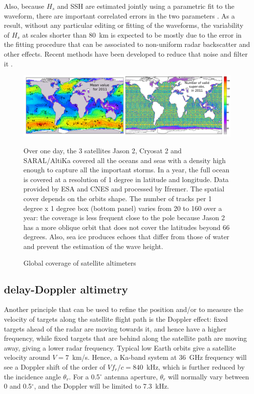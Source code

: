  Also, because $H_s$ and SSH are estimated jointly using a parametric fit to the waveform, there are important correlated errors in the two parameters \citep[e.g.][]{Dibarboure&al.2014,DeCarlo&al.2023}. 
 As a result, without any particular editing or fitting of the waveforms, the variability of $H_s$ at scales shorter than 80~km is 
 expected to be mostly due to the error in the fitting procedure that can be associated to non-uniform radar backscatter and other effects. Recent methods have been developed to reduce that noise and filter it \citep{Passaro&al.2015,Quilfen&Chapron2019}.
\begin{figure}[htb]
\centerline{\includegraphics[width=\textwidth]{FIGS_CH_SAT/altimetre_cartes2011.pdf}}
  \caption{Global coverage of satellite altimeters}
    {Over one day, the 3 satellites Jason 2, Cryosat 2 and SARAL/AltiKa covered all the oceans and seas with a density high enough to capture all the 
important storms. In a year, the full ocean is covered at a resolution of 1 degree in latitude and longitude.  
 Data provided by ESA and CNES and processed by Ifremer. The spatial 
cover depends on the orbits shape. The number of tracks per 1 degree x 1 degree box (bottom panel) varies
from 20 to 160 over a year: the coverage is less frequent close to the pole because Jason 2 has a more oblique orbit that does not cover the 
latitudes beyond 66 degrees. Also, sea ice  produces echoes that differ from those of water and prevent the estimation of the wave height.} 
\label{fig:altimeter_coverage}
\end{figure}

\subsection{delay-Doppler altimetry}\label{section:delay-Doppler}
Another principle that can be used to refine the position and/or to measure the velocity of targets along the satellite flight path is the Doppler effect: fixed targets ahead of the radar are moving towards it, and hence have a higher frequency, while fixed targets that are behind along the satellite path 
are moving away, giving a lower radar frequency. Typical low Earth orbits give a satellite velocity around $V=7$~km/s. Hence, a Ka-band system at 36~GHz frequency will see a Doppler shift
of the order of $V f_r/c = 840$~kHz, which is further reduced by the incidence angle $\theta_r$. For a 0.5$^\circ$  antenna aperture, $\theta_r$ will 
normally vary between 0 and 0.5$^\circ$,  and the Doppler will be limited to 7.3~kHz.  

